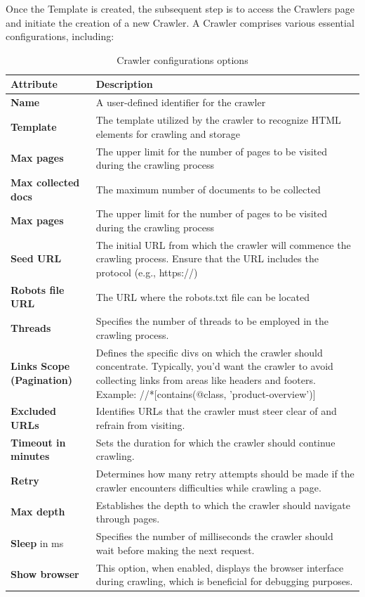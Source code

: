 Once the Template is created, the subsequent step is to access the Crawlers page and initiate the creation of a new Crawler. A Crawler comprises various essential configurations, including:

\begin{table}[ht] 
{\footnotesize
\begin{tabular}{ P{2.5cm} ||P{11.1cm}  }      %
 \hline \hline
\textbf{Attribute} & \textbf{Description}\T\B 
\\ 
\hline
\textbf{Name} & A user-defined identifier for the crawler \T\B 
\\ 
\hline
\textbf{Template} & The template utilized by the crawler to recognize HTML elements for crawling and storage \T\B 
\\ 
\hline
\textbf{Max pages} & The upper limit for the number of pages to be visited during the crawling process \T\B 
\\ 
\hline
\textbf{Max collected docs} & The maximum number of documents to be collected \T\B 
\\ 
\hline
\textbf{Max pages} & The upper limit for the number of pages to be visited during the crawling process \T\B 
\\ 
\hline
\textbf{Seed URL} & The initial URL from which the crawler will commence the crawling process. Ensure that the URL includes the protocol (e.g., https://) \T\B 
\\ 
\hline
\textbf{Robots file URL} & The URL where the robots.txt file can be located \T\B 
\\ 
\hline
\textbf{Threads} & Specifies the number of threads to be employed in the crawling process. \T\B 
\\ 
\hline
\textbf{Links Scope (Pagination)} & Defines the specific divs on which the crawler should concentrate. Typically, you'd want the crawler to avoid collecting links from areas like headers and footers. Example: //*[contains(@class, 'product-overview')] \T\B 
\\ 
\hline
\textbf{Excluded URLs} & Identifies URLs that the crawler must steer clear of and refrain from visiting. \T\B 
\\ 
\hline
\textbf{Timeout in minutes} & Sets the duration for which the crawler should continue crawling.\\ 
\hline
\textbf{Retry} & Determines how many retry attempts should be made if the crawler encounters difficulties while crawling a page. \T\B 
\\ 
\hline
\textbf{Max depth} & Establishes the depth to which the crawler should navigate through pages. \T\B 
\\ 
\hline
\textbf{Sleep} in ms & Specifies the number of milliseconds the crawler should wait before making the next request. \T\B 
\\ 
\hline
\textbf{Show browser} & This option, when enabled, displays the browser interface during crawling, which is beneficial for debugging purposes. \T\B 
\\ 
\hline \hline
    \end{tabular}
}
  \captionsetup{justification=centering,margin=2cm}
  \caption{Crawler configurations options}
\end{table}



